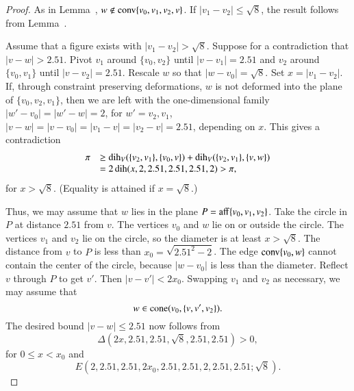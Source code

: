 \begin{tarskidata}
\begin{tarski}
\begin{proof}  As in Lemma~, 
$w\not\in{\operatorname{conv}}\{v_0,v_1,v_2,v\}$.  
If $|v_1-v_2|\le \sqrt{8}$, the result follows from
Lemma~. 

Assume that a figure exists with $|v_1-v_2|>\sqrt{8}$. Suppose for a
contradiction that $|v-w|>2.51$.    Pivot $v_1$ around $\{v_0,v_2\}$ until
$|v-v_1|=2.51$ and $v_2$ around $\{v_0,v_1\}$ until $|v-v_2|=2.51$.  Rescale
$w$ so that $|w-v_0|=\sqrt{8}$. Set $x = |v_1-v_2|$. If, through constraint
preserving deformations, $w$ is not deformed into the plane of 
$\{v_0,v_2,v_1\}$,
then we are left with the one-dimensional family $|w'-v_0|=|w'-w|=2$, for
$w'=v_2,v_1$, $|v-w|=|v-v_0|=|v_1-v|=|v_2-v|=2.51$, depending on  $x$. This
gives a contradiction
    $$
    \begin{array}{lll}
        \pi &\ge \operatorname{dih}_V(\{v_2,v_1\},\{v_0,v\}) + \operatorname{dih}_V(\{v_2,v_1\},\{v,w\})\\
        &= 2\operatorname{dih}(x,2,2.51,2.51,2.51,2)
         > \pi,
    \end{array}
    $$
for $x>\sqrt{8}$.
(Equality is attained if $x=\sqrt{8}$.)

Thus, we may assume that $w$ lies in the plane $P={\operatorname{aff}}\{v_0,v_1,v_2\}$. Take the
circle in $P$ at distance $2.51$ from $v$. The vertices $v_0$ and $w$ lie
on or outside the circle. The vertices $v_1$ and $v_2$ lie on the
circle, so the diameter is at least $x>\sqrt{8}$.  The distance from
$v$ to $P$ is less than $x_0= \sqrt{2.51^2-2}$.  The edge 
${\operatorname{conv}}\{v_0,w\}$ cannot
contain the center of the circle, because $|w-v_0|$ is less than the
diameter.
%
Reflect $v$ through $P$ to get $v'$.  Then $|v-v'|< 2x_0$. Swapping
$v_1$ and $v_2$ as necessary, we may assume that 
  $$w\in{\operatorname{cone}}(v_0,\{v,v',v_2\}).$$  
The desired bound $|v-w|\le 2.51$ now follows from
  $$
  \Delta(2x,2.51,2.51,\sqrt8,2.51,2.51)>0,
  $$
for $0\le x< x_0$ and
  $$
  E(2,2.51,2.51,2x_0,2.51,2.51,2,2.51,2.51; \sqrt8).
  $$
\end{proof}
\end{tarski}







\begin{tarski}


\end{tarski}
\end{tarskidata}
